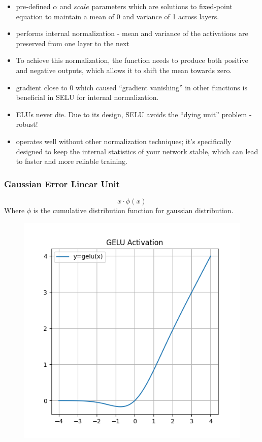 \documentclass[11pt]{article}
\begin{document}
\begin{itemize}
    \item pre-defined $\alpha$ and $scale$ parameters which are solutions to fixed-point equation to maintain a mean of 0 and variance of 1 across layers.
    \item performs internal normalization - mean and variance of the activations are preserved from one layer to the next
    \item To achieve this normalization, the function needs to produce both positive and negative outputs, which allows it to shift the mean towards zero. 
    \item gradient close to 0 which caused ``gradient vanishing'' in other functions is beneficial in SELU for internal normalization.
    \item ELUs never die. Due to its design, SELU avoids the ``dying unit'' problem - robust!
    \item operates well without other normalization techniques; it's specifically designed to keep the internal statistics of your network stable, which can lead to faster and more reliable training.
\end{itemize}

\subsubsection{Gaussian Error Linear Unit}

\begin{definition}\label{eq:activation-gelu}
    \begin{equation*}
        x \cdot \phi(x)
    \end{equation*}
    Where $\phi$ is the cumulative distribution function for gaussian distribution.
\end{definition}

\begin{figure}[H]
    \centering
    \includegraphics*[width=.4\linewidth]{figures/GELU Activation.png}\label{fig:gelu}
\end{figure}
\end{document}
